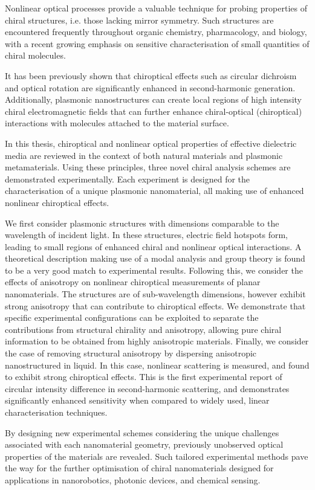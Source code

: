 Nonlinear optical processes provide a valuable technique for probing properties of chiral structures, i.e. those lacking mirror symmetry. 
Such structures are encountered frequently throughout organic chemistry, pharmacology, and biology, with a recent growing emphasis on sensitive characterisation of small quantities of chiral molecules. 
	    
It has been previously shown that chiroptical effects such as circular dichroism and optical rotation are significantly enhanced in second-harmonic generation. 
Additionally, plasmonic nanostructures can create local regions of high intensity chiral electromagnetic fields that can further enhance chiral-optical (chiroptical) interactions with molecules attached to the material surface. 
	    
In this thesis, chiroptical and nonlinear optical properties of effective dielectric media are reviewed in the context of both natural materials and plasmonic metamaterials. 
Using these principles, three novel chiral analysis schemes are demonstrated experimentally. Each experiment is designed for the characterisation of a unique plasmonic nanomaterial, all making use of enhanced nonlinear chiroptical effects. 

We first consider plasmonic structures with dimensions comparable to the wavelength of incident light. In these structures, electric field hotspots form, leading to small regions of enhanced chiral and nonlinear optical interactions. A theoretical description making use of a modal analysis and group theory is found to be a very good match to experimental results. Following this, we consider the effects of anisotropy on nonlinear chiroptical measurements of planar nanomaterials. The structures are of sub-wavelength dimensions, however exhibit strong anisotropy that can contribute to chiroptical effects. We demonstrate that specific experimental configurations can be exploited to separate the contributions from structural chirality and anisotropy, allowing pure chiral information to be obtained from highly anisotropic materials. Finally, we consider the case of removing structural anisotropy by dispersing anisotropic nanostructured in liquid. In this case, nonlinear scattering is measured, and found to exhibit strong chiroptical effects. This is the first experimental report of circular intensity difference in second-harmonic scattering, and demonstrates significantly enhanced sensitivity when compared to widely used, linear characterisation techniques.

By designing new experimental schemes considering the unique challenges associated with each nanomaterial geometry, previously unobserved optical properties of the materials are revealed. Such tailored experimental methods pave the way for the further optimisation of chiral nanomaterials designed for applications in nanorobotics, photonic devices, and chemical sensing.